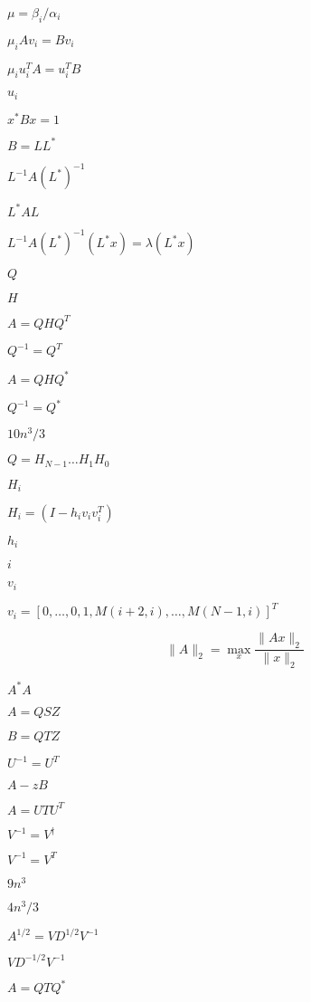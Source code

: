 \documentclass{article}
\begin{document}
$ \mu = \beta_i / \alpha_i$
\pagebreak

$ \mu_i A v_i = B v_i $
\pagebreak

$ \mu_i u_i^T A  = u_i^T B $
\pagebreak

$ u_i $
\pagebreak

$ x^* B x = 1 $
\pagebreak

$ B = LL^* $
\pagebreak

$ L^{-1} A (L^*)^{-1} $
\pagebreak

$ L^{*} A L $
\pagebreak

$ L^{-1} A (L^*)^{-1} (L^* x) = \lambda (L^* x) $
\pagebreak

$ Q $
\pagebreak

$ H $
\pagebreak

$ A = Q H
Q^T $
\pagebreak

$ Q^{-1} = Q^T $
\pagebreak

$ A = Q H Q^* $
\pagebreak

$ Q^{-1} = Q^* $
\pagebreak

$ 10n^3/3 $
\pagebreak

$ Q = H_{N-1} \ldots H_1 H_0 $
\pagebreak

$ H_i $
\pagebreak

$ H_i = (I - h_i v_i v_i^T) $
\pagebreak

$ h_i $
\pagebreak

$ i $
\pagebreak

$ v_i $
\pagebreak

$ v_i = [ 0, \ldots, 0, 1, M(i+2,i), \ldots, M(N-1,i) ]^T $
\pagebreak

\[ \|A\|_2 = \max_x \frac{\|Ax\|_2}{\|x\|_2} \]
\pagebreak

$ A^*A $
\pagebreak

$ A = Q S Z $
\pagebreak

$ B = Q T Z $
\pagebreak

$ U^{-1} = U^T $
\pagebreak

$ A - z B $
\pagebreak

$ A = U T U^T $
\pagebreak

$ V^{-1} = V^{\dagger} $
\pagebreak

$ V^{-1} = V^T $
\pagebreak

$ 9n^3 $
\pagebreak

$ 4n^3/3 $
\pagebreak

$ A^{1/2} = V D^{1/2} V^{-1} $
\pagebreak

$ V D^{-1/2} V^{-1} $
\pagebreak

$ A = Q T Q^* $
\pagebreak
\end{document}
